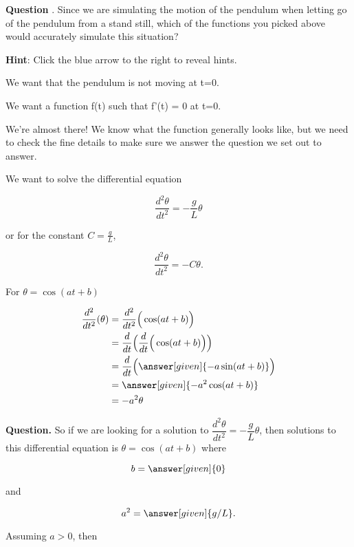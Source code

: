 \documentclass[handout,nooutcomes]{ximera}
\begin{document}
\begin{example}
\begin{explanation}
\textbf{Question }. Since we are simulating the motion of the pendulum when letting go of the pendulum from
a stand still, which of the functions you picked above would accurately simulate this situation?
\begin{selectAll}
\end{selectAll}

\textbf{Hint}: Click the blue arrow to the right to reveal hints.
\begin{expandable}
We want that the pendulum is not moving at t=0.
\begin{expandable}
We want a function f(t) such that f'(t) = 0 at t=0.
\end{expandable}
\end{expandable}



We're almost there! We know what the function generally looks like, but we
need to check the fine details to make sure we answer the question we set out to answer.

We want to solve the differential equation

\[
\dfrac{d^2 \theta}{d t^2}  = -\dfrac{g}{L} \theta
\]

or for the constant $C=\frac{g}{L}$,

\[
\dfrac{d^2 \theta}{d t^2}  = -C\theta.
\]

For $\theta = \cos(at+b)$

\begin{align*}
    \dfrac{d^2}{d t^2}(\theta) &= \dfrac{d^2}{d t^2}\Big(\cos(a t + b)\Big)\\
    &= \dfrac{d}{d t} \Big( \dfrac{d}{dt}\Big(\cos(a t + b) \Big) \Big)\\
    &= \dfrac{d}{d t} \Big( \answer[given]{- a \sin(a t+b)}\Big)\\
    &= \answer[given]{-a^2 \cos(a t+b)}\\
    &= -a^2 \theta 
\end{align*}


\textbf{Question. } So if we are looking for a solution to $\dfrac{d^2 \theta}{d t^2}  = -\dfrac{g}{L} \theta$,
then solutions to this differential equation is $\theta = \cos(at+b)$ where

\[
b = \answer[given]{0}
\]

and 

\[
a^2 = \answer[given]{g/L}.
\]

Assuming $a>0$, then 


\end{explanation}
\end{example}
\end{document}
